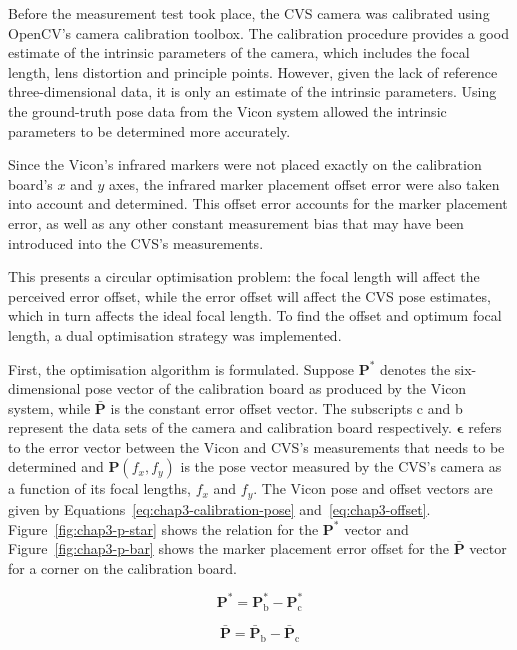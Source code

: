 Before the measurement test took place, the CVS camera was calibrated using OpenCV's camera calibration toolbox. The calibration procedure provides a good estimate of the intrinsic parameters of the camera, which includes the focal length, lens distortion and principle points. However, given the lack of reference three-dimensional data, it is only an estimate of the intrinsic parameters. Using the ground-truth pose data from the Vicon system allowed the intrinsic parameters to be determined more accurately. 

Since the Vicon's infrared markers were not placed exactly on the calibration board's $x$ and $y$ axes, the infrared marker placement offset error were also taken into account and determined. This offset error accounts for the marker placement error, as well as any other constant measurement bias that may have been introduced into the CVS's measurements. 

This presents a circular optimisation problem: the focal length will affect the perceived error offset, while the error offset will affect the CVS pose estimates, which in turn affects the ideal focal length. To find the offset and optimum focal length, a dual optimisation strategy was implemented.  

First, the optimisation algorithm is formulated. Suppose $\bm{P}^*$ denotes the six-dimensional pose vector of the calibration board as produced by the Vicon system, while $\bar{\bm{P}}$ is the constant error offset vector. The subscripts c and b represent the data sets of the camera and calibration board respectively. $\bm{\epsilon}$ refers to the error vector between the Vicon and CVS's measurements that needs to be determined and $\bm{P}(f_x, f_y)$ is the pose vector measured by the CVS's camera as a function of its focal lengths, $f_x$ and $f_y$. The Vicon pose and offset vectors are given by Equations~\ref{eq:chap3-calibration-pose} and~\ref{eq:chap3-offset}. Figure~\ref{fig:chap3-p-star} shows the relation for the $\bm{P}^*$ vector and Figure~\ref{fig:chap3-p-bar} shows the marker placement error offset for the $\bar{\bm{P}}$ vector for a corner on the calibration board. 

\begin{equation}
 \label{eq:chap3-calibration-pose}
 \bm{P}^* = \bm{P}^*_\mathrm{b} - \bm{P}^*_\mathrm{c}
\end{equation}

\begin{equation}
  \label{eq:chap3-offset}
  \bar{\bm{P}} = \bar{\bm{P}}_\mathrm{b} - \bar{\bm{P}}_\mathrm{c}
\end{equation}

